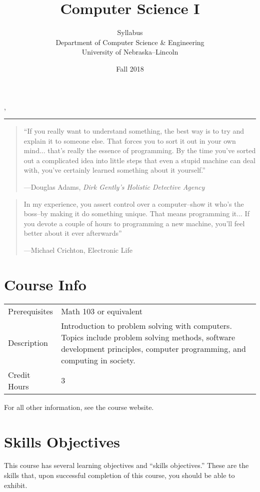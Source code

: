 \documentclass[12pt]{scrartcl}
\title{Computer Science I}\let\Title\@title
\subtitle{Syllabus\\
{\small
\vskip1cm
Department of Computer Science \& Engineering \\
University of Nebraska--Lincoln}
\vskip-1cm}
\date{Fall 2018}
\begin{document}
\maketitle

\newwatermark[allpages=true,scale=5,textmark=Draft]{},

\hrule

\begin{quote}
``If you really want to understand something, the best way is to try and explain it to someone else. That forces you to sort it out in your own mind... that's really the essence of programming. By the time you've sorted out a complicated idea into little steps that even a stupid machine can deal with, you've certainly learned something about it yourself.'' 

\hfill ---Douglas Adams, \emph{Dirk Gently's Holistic Detective Agency}
\end{quote}

\begin{quote}
In my experience, you assert control over a computer--show it who's the boss--by making it do something unique. That means programming it... If you devote a couple of hours to programming a new machine, you'll feel better about it ever afterwards'' 

\hfill ---Michael Crichton, Electronic Life
\end{quote}

\section{Course Info}

\begin{tabular}{lp{10cm}}
Prerequisites & Math 103 or equivalent \\
Description  & Introduction to problem solving with computers. 
Topics include problem solving methods, software development 
principles, computer programming, and computing in society.\\
Credit Hours & 3\\
\end{tabular}

For all other information, see the course website.

\section{Skills Objectives}

This course has several learning objectives and ``skills objectives.''
These are the skills that, upon successful completion of this course, 
you should be able to exhibit.
\end{document}
